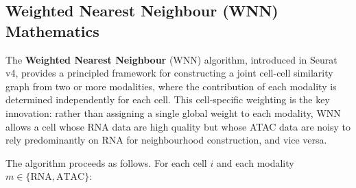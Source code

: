 \subsection{Weighted Nearest Neighbour (WNN) Mathematics}
\label{subsec:multiomics:wnn-math}

The \textbf{Weighted Nearest Neighbour} (WNN) algorithm, introduced in Seurat v4, provides a principled framework for constructing a joint cell-cell similarity graph from two or more modalities, where the contribution of each modality is determined independently for each cell. This cell-specific weighting is the key innovation: rather than assigning a single global weight to each modality, WNN allows a cell whose RNA data are high quality but whose ATAC data are noisy to rely predominantly on RNA for neighbourhood construction, and vice versa.

The algorithm proceeds as follows. For each cell $i$ and each modality $m \in \{\text{RNA}, \text{ATAC}\}$:

